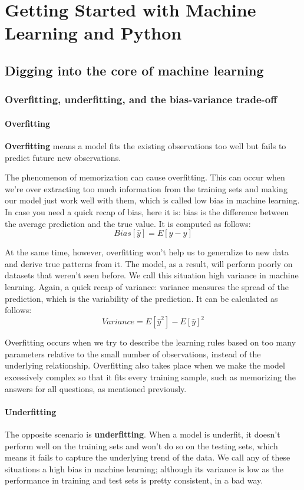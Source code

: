 \chapter{Getting Started with Machine Learning and Python\label{Ch01}}
\section{Digging into the core of machine learning}
\subsection{Overfitting, underfitting, and the bias-variance trade-off}
\subsubsection*{Overfitting}
\textbf{Overfitting} means a model fits the existing observations too well but fails to predict future new observations.

The phenomenon of memorization can cause overfitting. This can occur when we're over extracting too much information from the training sets and making our model just work well with them, which is called low bias in machine learning. In case you need a quick recap of bias, here it is: bias is the difference between the average prediction and the true value. It is computed as follows:
$$Bias[\hat{y}] = E[\hat{y}-y]$$

At the same time, however, overfitting won't help us to generalize to new data and derive true patterns from it. The model, as a result, will perform poorly on datasets that weren't seen before. We call this situation high variance in machine learning. Again, a quick recap of variance: variance measures the spread of the prediction, which is the variability of the prediction. It can be calculated as follows:
$$Variance = E[\hat{y}^2]-E[\hat{y}]^2$$

Overfitting occurs when we try to describe the learning rules based on too many parameters relative to the small number of observations, instead of the underlying relationship. Overfitting also takes place when we make the model excessively complex so that it fits every training sample, such as memorizing the answers for all questions, as mentioned previously.

\subsubsection*{Underfitting}
The opposite scenario is \textbf{underfitting}. When a model is underfit, it doesn't perform well on the training sets and won't do so on the testing sets, which means it fails to capture the underlying trend of the data. We call any of these situations a high bias in machine learning; although its variance is low as the performance in training and test sets is pretty consistent, in a bad way.

